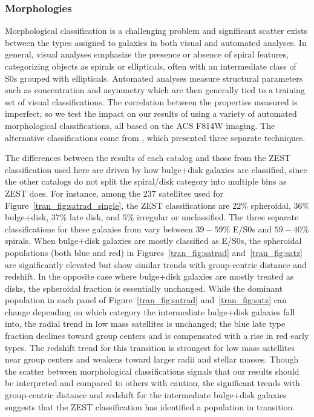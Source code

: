 \subsubsection{Morphologies}
\label{tran_s:sys_morph}

Morphological classification is a challenging problem and significant
scatter exists between the types assigned to galaxies in both visual
and automated analyses. In general, visual analyses emphasize the
presence or absence of spiral features, categorizing objects as
spirals or ellipticals, often with an intermediate class of S0s
grouped with ellipticals. Automated analyses measure structural
parameters such as concentration and asymmetry which are then
generally tied to a training set of visual classifications. The
correlation between the properties measured is imperfect, so we test
the impact on our results of using a variety of automated
morphological classifications, all based on the ACS F814W imaging. The
alternative classifications come from \citet{Tasca2009}, which
presented three separate techniques.

The differences between the results of each catalog and those from the
ZEST classification used here are driven by how bulge+disk
galaxies are classified, since the other catalogs do not split the
spiral/disk category into multiple bins as ZEST does. For instance,
among the $237$ satellites used for Figure~\ref{tran_fig:satrad_single},
the ZEST classifications are $22\%$ spheroidal, $36\%$ bulge+disk,
$37\%$ late disk, and $5\%$ irregular or unclassified. The three separate
classifications for these galaxies from \citet{Tasca2009} vary between
$39 - 59\%$ E/S0s and $59 - 40\%$ spirals.
When bulge+disk galaxies are mostly classified as E/S0s, the
spheroidal populations (both blue and red) in Figures~\ref{tran_fig:satrad}
and~\ref{tran_fig:satz} are significantly elevated but show similar trends
with group-centric distance and redshift. In the opposite case where
bulge+disk galaxies are mostly treated as disks, the spheroidal
fraction is essentially unchanged. While the dominant population in
each panel of Figure~\ref{tran_fig:satrad} and~\ref{tran_fig:satz} can change
depending on which category the intermediate bulge+disk galaxies fall
into, the radial trend in low mass satellites is unchanged; the blue
late type fraction declines toward group centers and is compensated
with a rise in red early types. The redshift trend for this transition
is strongest for low mass satellites near group centers and weakens
toward larger radii and stellar masses. Though the scatter between
morphological classifications signals that our results should be
interpreted and compared to others with caution, the significant
trends with group-centric distance and redshift for the intermediate
bulge+disk galaxies suggests that the ZEST classification has
identified a population in transition.

